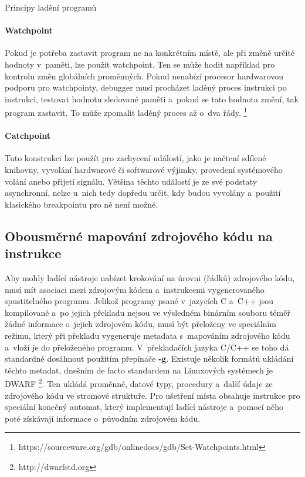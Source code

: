 \documentclass[czech,bachelor,male,python,dept460,hidelinks]{diploma}						%
\begin{document}
\begin{section}{Principy ladění programů}
		\paragraph*{Watchpoint}
			Pokud je potřeba zastavit program ne na konkrétním místě, ale při změně určité hodnoty v~paměti, lze použít watchpoint. Ten se může hodit například pro
			kontrolu změn globálních proměnných. Pokud nenabízí procesor hardwarovou podporu pro watchpointy, debugger musí procházet laděný proces instrukci po
			instrukci, testovat hodnotu sledované paměti a~pokud se tato hodnota změní, tak program zastavit. To může zpomalit laděný proces až
			o~dva řády. \footnote{https://sourceware.org/gdb/onlinedocs/gdb/Set-Watchpoints.html}
		\paragraph*{Catchpoint}
			Tuto konstrukci lze použít pro zachycení událostí, jako je načtení sdílené knihovny, vyvolání hardwarové či softwarové výjimky, provedení
			systémového volání anebo přijetí signálu. Většina těchto událostí je ze své podstaty asynchronní, nelze u~nich tedy dopředu určit, kdy budou vyvolány
			a~použití klasického breakpointu pro ně není možné.	
		
	\subsection{Obousměrné mapování zdrojového kódu na instrukce}
		Aby mohly ladící nástroje nabízet krokování na úrovni (řádků) zdrojového kódu, musí mít asociaci mezi zdrojovým kódem a~instrukcemi vygenerovaného
		spustitelného programu. Jelikož programy psané v~jazycích C a~C++ jsou kompilované a~po jejich překladu nejsou
		ve výsledném binárním souboru téměř žádné informace o~jejich zdrojovém kódu, musí být přeloženy ve speciálním režimu, který při překladu vygeneruje
		metadata s~mapováním zdrojového kódu a~vloží je do přeloženého programu. V~překladačích jazyka C/C++ se toho dá standardně dosáhnout použitím
		přepínače \textbf{-g}. Existuje několik formátů ukládání těchto metadat, dnešním de facto standardem na Linuxových systémech je DWARF
		\footnote{http://dwarfstd.org}. Ten ukládá proměnné, datové typy, procedury a~další údaje ze zdrojového kódu ve stromové struktuře.
		Pro ušetření místa obsahuje instrukce pro speciální konečný automat, který implementují ladící nástroje a~pomocí něho poté získávají
		informace o~původním zdrojovém kódu.
		

\end{section}
\end{document}
